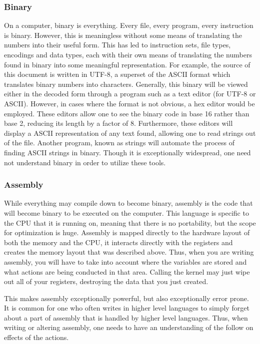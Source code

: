 \documentclass[a4paper,11pt]{report}
\begin{document}
		\subsubsection{Binary}
			On a computer, binary is everything.
			Every file, every program, every instruction is binary. 
			However, this is meaningless without some means of translating the numbers into their useful form. 
			This has led to instruction sets, file types, encodings and data types, each with their own means of translating the numbers found in binary into some meaningful representation. 
			For example, the source of this document is written in UTF-8, a superset of the ASCII format which translates binary numbers into characters. 
			Generally, this binary will be viewed either in the decoded form through a program such as a text editor (for UTF-8 or ASCII). 
			However, in cases where the format is not obvious, a hex editor would be employed. 
			These editors allow one to see the binary code in base 16 rather than base 2, reducing its length by a factor of 8. 
			Furthermore, these editors will display a ASCII representation of any text found, allowing one to read strings out of the file. 
			Another program, known as strings will automate the process of finding ASCII strings in binary. 
			Though it is exceptionally widespread, one need not understand binary in order to utilize these tools. 
		\subsubsection{Assembly}
			While everything may compile down to become binary, assembly is the code that will become binary to be executed on the computer. 
			This language is specific to the CPU that it is running on, meaning that there is no portability, but the scope for optimization is huge. 
			Assembly is mapped directly to the hardware layout of both the memory and the CPU, it interacts directly with the registers and creates the memory layout that was described above. 
			Thus, when you are writing assembly, you will have to take into account where the variables are stored and what actions are being conducted in that area. 
			Calling the kernel may just wipe out all of your registers, destroying the data that you just created. 

			This makes assembly exceptionally powerful, but also exceptionally error prone. 
			It is common for one who often writes in higher level languages to simply forget about a part of assembly that is handled by higher level languages. 
			Thus, when writing or altering assembly, one needs to have an understanding of the follow on effects of the actions. 
\end{document}
